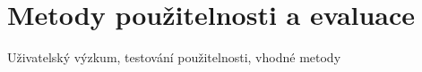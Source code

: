 
\section{Metody použitelnosti a evaluace}
Uživatelský výzkum, testování použitelnosti, vhodné metody